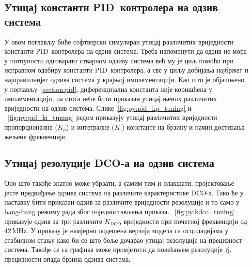 \documentclass[master]{finthesis}
\def \DCO  {DCO} %
\def \PID  {PID} %
\begin{document}
\subsection{Утицај константи \PID\ контролера на одзив система} \label{section:python_model:pid_tuning}
У овом поглављу биће софтверски симулиран утицај различитих вриједности константи \PID\ контролера на одзив система. Треба напоменути да одзив не мора у потпуности одговарати стварном одзиву система већ му је циљ помоћи при исправном одабиру константи \PID\ контролера, а све у циљу добијања најбржег и најправилнијег одзива система у крајњој имплементацији. Као што је објашњено у поглављу~\ref{section:pid}, диференцијална константа није коришћена у имплементацији, па стога неће бити приказан утицај њених различитих вриједности на одзив система. Слике~\ref{fig:py:pid_kp_tuning} и ~\ref{fig:py:pid_ki_tuning} редом приказују утицај различитих вриједности пропорционалне ($K_\text{p}$) и интегралне ($K_\text{i}$) константе на брзину и начин достизања жељене фреквенције.



\subsection{Утицај резолуције \DCO-а на одзив система} \label{section:python_model:dco_tuning}
Оно што такође знатно може убрзати, а самим тим и олакшати, пројектовање јесте предвиђање одзива система на различите карактеристике \DCO-а. Тако ће у наставку бити приказан одзив за различите вриједности резолуције и то само у bang-bang режиму рада због поједностављења приказа. \figurename~\ref{fig:py:kdco_tuning} приказује одзив за три различите $K_\text{DCO}$ вриједности при почетној фреквенцији од 42\,MHz. У приказу је намјерно подешена верзија модела са осцилацијама у стабилном стању како би се што боље дочарао утицај резолуције на прецизност система. Такође се са графика може примјетити да повећањем резолуције тј. прецизности опада брзина одзива система. 

\end{document}
